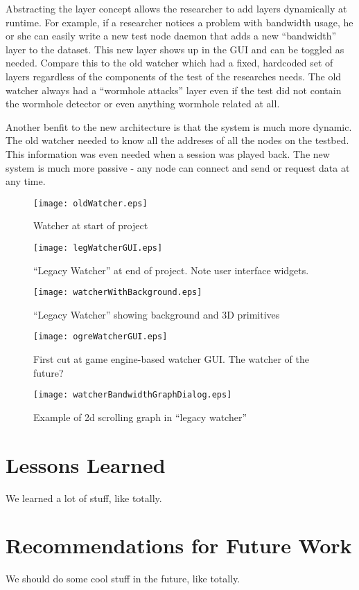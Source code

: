 \documentclass{report}
\begin{document}
Abstracting the layer concept allows the researcher to add layers dynamically at runtime. For example, 
if a researcher notices a problem with bandwidth usage, he or she can easily write a new test node daemon that 
adds a new ``bandwidth'' layer to the dataset. This new layer shows up in the GUI and can be toggled as needed. 
Compare this to the old watcher which had a fixed, hardcoded set of layers regardless of the components of the test
of the researches needs. The old watcher always had a ``wormhole attacks'' layer even if the test did not 
contain the wormhole detector or even anything wormhole related at all. 

Another benfit to the new architecture is that the system is much more dynamic. The old watcher needed to know all the addreses of all the nodes
on the testbed. This information was even needed when a session was played back. The new system is much more passive - any node can connect and 
send or request data at any time. 

\begin{figure}
\label{fig:oldWatcher}
\centering
\texttt{[image: oldWatcher.eps]}
\caption{Watcher at start of project}
\end{figure}

\begin{figure}
\label{fig:legWatcherGUI}
\centering
\texttt{[image: legWatcherGUI.eps]}
\caption{``Legacy Watcher'' at end of project. Note user interface widgets.}
\end{figure}

\begin{figure}
\label{fig:watcherWithBackground}
\centering
\texttt{[image: watcherWithBackground.eps]}
\caption{``Legacy Watcher'' showing background and 3D primitives}
\end{figure}

\begin{figure}
\label{fig:ogreWatcherGUI}
\centering
\texttt{[image: ogreWatcherGUI.eps]}
\caption{First cut at game engine-based watcher GUI. The watcher of the future?}
\end{figure}

\begin{figure}
\label{fig:watcherBandwidthGraphDialog}
\centering
\texttt{[image: watcherBandwidthGraphDialog.eps]}
\caption{Example of 2d scrolling graph in ``legacy watcher''}
\end{figure}

\section{Lessons Learned}
We learned a lot of stuff, like totally.

\section{Recommendations for Future Work}
We should do some cool stuff in the future, like totally. 
\end{document}
